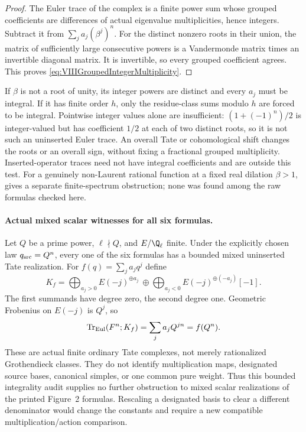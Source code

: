 \begin{proof}
The Euler trace of the complex is a finite
power sum whose grouped coefficients are
differences of actual eigenvalue multiplicities,
hence integers. Subtract it from
\(\sum_j a_j(\beta^j)^n\).
For the distinct nonzero roots in their union,
the matrix of sufficiently large consecutive
powers is a Vandermonde matrix times an
invertible diagonal matrix. It is invertible,
so every grouped coefficient agrees.
This proves \eqref{eq:VIIIGroupedIntegerMultiplicity}.
\end{proof}

If \(\beta\) is not a root of unity, its
integer powers are distinct and every \(a_j\)
must be integral. If it has finite order \(h\),
only the residue-class sums modulo \(h\)
are forced to be integral.
Pointwise integer values alone are insufficient:
\((1+(-1)^n)/2\) is integer-valued but has
coefficient \(1/2\) at each of two distinct
roots, so it is not such an uninserted Euler trace.
An overall Tate or cohomological shift changes
the roots or an overall sign, without fixing
a fractional grouped multiplicity.
Inserted-operator traces need not have integral
coefficients and are outside this test.
For a genuinely non-Laurent rational function
at a fixed real dilation \(\beta>1\),
 gives a separate finite-spectrum
obstruction; none was found among the raw
formulas checked here.

\paragraph{Actual mixed scalar witnesses for all six formulas.}
Let \(Q\) be a prime power, \(\ell\nmid Q\),
and \(E/\Q_\ell\) finite. Under the explicitly
chosen law \(q_{\rm src}=Q^n\), every one
of the six formulas has a bounded mixed
uninserted Tate realization.
For \(f(q)=\sum_j a_jq^j\) define
\[
 K_f=
 \bigoplus_{a_j>0}E(-j)^{\oplus a_j}
 \ \oplus\!
 \bigoplus_{a_j<0}E(-j)^{\oplus(-a_j)}[-1].
\]
The first summands have degree zero, the
second degree one. Geometric Frobenius on
\(E(-j)\) is \(Q^j\), so
\[
       \operatorname{Tr}_{\rm Eul}(F^n;K_f)
                    =\sum_j a_jQ^{jn}=f(Q^n).
\]
These are actual finite ordinary Tate complexes,
not merely rationalized Grothendieck classes.
They do not identify multiplication maps,
designated source bases, canonical simples,
or one common pure weight.
Thus this bounded integrality audit supplies
no further obstruction to mixed scalar
realizations of the printed Figure~2 formulas.
Rescaling a designated basis to clear a
different denominator would change the
constants and require a new compatible
multiplication/action comparison.

